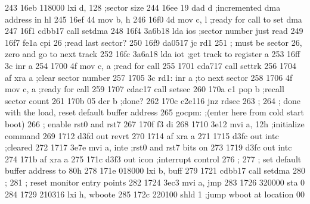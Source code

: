 243      16eb 118000               lxi      d, 128     ;sector size
244      16ee 19                   dad      d          ;incremented dma address in hl
245      16ef 44                   mov      b, h        
246      16f0 4d                   mov      c, l       ;ready for call to set dma
247      16f1 cdbb17               call     setdma
248      16f4 3a6b18               lda      ios        ;sector number just read
249      16f7 fe1a                 cpi      26         ;read last sector?
250      16f9 da0517               jc       rd1
251                       ;        must be sector 26, zero and go to next track
252      16fc 3a6a18               lda      iot        ;get track to register a
253      16ff 3c                   inr      a
254      1700 4f                   mov      c, a       ;read for call
255      1701 cda717               call     settrk
256      1704 af                   xra      a          ;clear sector number
257      1705 3c          rd1:     inr      a          ;to next sector
258      1706 4f                   mov      c, a       ;ready for call
259      1707 cdac17               call     setsec
260      170a c1                   pop      b          ;recall sector count
261      170b 05                   dcr      b          ;done?
262      170c c2e116               jnz      rdsec
263                       ;
264                       ;        done with the load, reset default buffer address
265                       gocpm:   ;(enter here from cold start boot)
266                       ;        enable rst0 and rst7
267      170f f3                   di
268      1710 3e12                 mvi      a, 12h     ;initialize command
269      1712 d3fd                 out      revrt
270      1714 af                   xra      a
271      1715 d3fc                 out      intc       ;cleared
272      1717 3e7e                 mvi      a, inte    ;rst0 and rst7 bits on
273      1719 d3fc                 out      intc
274      171b af                   xra      a
275      171c d3f3                 out      icon       ;interrupt control
276                       ;
277                       ;        set default buffer address to 80h
278      171e 018000               lxi      b, buff
279      1721 cdbb17               call     setdma
280                       ;
281                       ;        reset monitor entry points
282      1724 3ec3                 mvi      a, jmp
283      1726 320000               sta      0
284      1729 210316               lxi      h, wboote
285      172c 220100               shld     1          ;jump wboot at location 00
